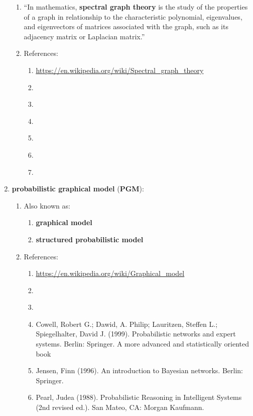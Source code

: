 \begin{enumerate}
\begin{enumerate}
	\item ``In mathematics, {\bf spectral graph theory} is the study of the properties of a graph in relationship to the characteristic polynomial, eigenvalues, and eigenvectors of matrices associated with the graph, such as its adjacency matrix or Laplacian matrix.''
	\item References: \vspace{-0.2cm}
		\begin{enumerate} \itemsep -2pt
		\item \url{https://en.wikipedia.org/wiki/Spectral_graph_theory}
		\item \cite{Spielman2007}
		\item \cite{Brouwer2012}
		\item \cite{Cvetkovic2010}
		\item \cite{vanMieghem2011}
		\item \cite{Thornton2001}
		\item \cite{Gross2004}
		\end{enumerate}
	\end{enumerate}
\item {\bf probabilistic graphical model} ({\bf PGM}): \vspace{-0.3cm}
	\begin{enumerate} \itemsep -2pt
	\item Also known as: \vspace{-0.2cm}
		\begin{enumerate} \itemsep -2pt
		\item {\bf graphical model}
		\item {\bf structured probabilistic model}
		\end{enumerate}
	\item References: \vspace{-0.2cm}
		\begin{enumerate} %
		\item \url{https://en.wikipedia.org/wiki/Graphical_model}
		\item \cite{Barber2012}
		\item \cite{Bishop2006}
		\item Cowell, Robert G.; Dawid, A. Philip; Lauritzen, Steffen L.; Spiegelhalter, David J. (1999). Probabilistic networks and expert systems. Berlin: Springer. A more advanced and statistically oriented book
		\item Jensen, Finn (1996). An introduction to Bayesian networks. Berlin: Springer.
		\item Pearl, Judea (1988). Probabilistic Reasoning in Intelligent Systems (2nd revised ed.). San Mateo, CA: Morgan Kaufmann. 

\end{enumerate}
\end{enumerate}
\end{enumerate}
